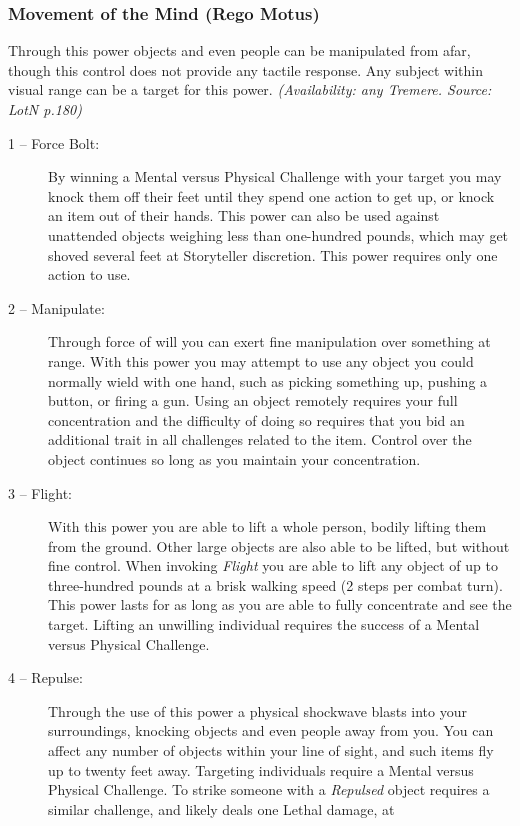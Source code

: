 \subsubsection{Movement of the Mind (Rego Motus)}
Through this power objects and even people can be manipulated from afar, though this control does not provide 
any tactile response.  Any subject within visual range can be a target for this power.  \emph{(Availability: any 
Tremere.  Source: LotN p.180)}

\begin{description}
	\item[1 -- Force Bolt:]  By winning a Mental versus Physical Challenge with your target you may knock them 
	off their feet until they spend one action to get up, or knock an item out of their hands.  This power can 
	also be used against unattended objects weighing less than one-hundred pounds, which may get shoved several 
	feet at Storyteller discretion.  This power requires only one action to use.
	\item[2 -- Manipulate:]  Through force of will you can exert fine manipulation over something at range.  
	With this power you may attempt to use any object you could normally wield with one hand, such as picking 
	something up, pushing a button, or firing a gun.  Using an object remotely requires your full concentration 
	and the difficulty of doing so requires that you bid an additional trait in all challenges related to the 
	item.  Control over the object continues so long as you maintain your concentration.
	\item[3 -- Flight:]  With this power you are able to lift a whole person, bodily lifting them from the ground.  
	Other large objects are also able to be lifted, but without fine control.  When invoking \emph{Flight} you are 
	able to lift any object of up to three-hundred pounds at a brisk walking speed (2 steps per combat turn).  
	This power lasts for as long as you are able to fully concentrate and see the target.  Lifting an unwilling 
	individual requires the success of a Mental versus Physical Challenge.
	\item[4 -- Repulse:]  Through the use of this power a physical shockwave blasts into your surroundings, knocking 
	objects and even people away from you.  You can affect any number of objects within your line of sight, and such 
	items fly up to twenty feet away.  Targeting individuals require a Mental versus Physical Challenge.  To strike 
	someone with a \emph{Repulsed} object requires a similar challenge, and likely deals one Lethal damage, at 

\end{description}
